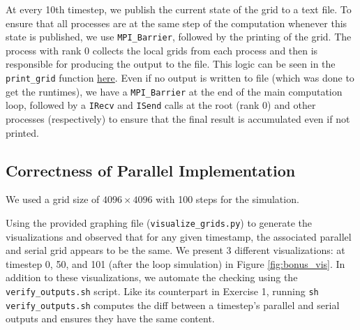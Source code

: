 \documentclass[a4paper,10pt]{article}
\begin{document}
At every 10th timestep, we publish the current state of the grid to a text file. To ensure that all processes are at the same step of the computation whenever this state is published, we use \verb|MPI_Barrier|, followed by the printing of the grid. The process with rank 0 collects the local grids from each process and then is responsible for producing the output to the file. This logic can be seen in the \verb|print_grid| function \href{https://github.com/paulmyr/DD2356-MethodsHPC/blob/master/4_mpi/bonus/life_parallel.c#L192}{here}. Even if no output is written to file (which was done to get the runtimes), we have a \verb|MPI_Barrier| at the end of the main computation loop, followed by a \verb|IRecv| and \verb|ISend| calls at the root (rank 0) and other processes (respectively) to ensure that the final result is accumulated even if not printed.  

\subsection{Correctness of Parallel Implementation}
We used a grid size of $4096 \times 4096$ with 100 steps for the simulation.

Using the provided graphing file (\verb|visualize_grids.py|) to generate the visualizations and observed that for any given timestamp, the associated parallel and serial grid appears to be the same. We present 3 different visualizations: at timestep 0, 50, and 101 (after the loop simulation) in Figure \ref{fig:bonus_vis}. In addition to these visualizations, we automate the checking using the \verb|verify_outputs.sh| script. Like its counterpart in Exercise 1, running \verb|sh verify_outputs.sh| computes the diff between a timestep's parallel and serial outputs and ensures they have the same content.
\end{document}
